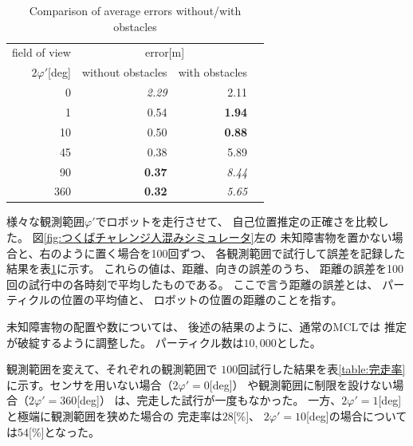 \documentclass{jarticle}
\begin{document}
\begin{table}[htbp]
	\centering
	\caption{Comparison of average errors without/with obstacles}
  \label{table:error}
	\begin{small}
  \begin{tabular}{|r|r|r|r|} \hline
	  field of view & \multicolumn{2}{c|}{error[m]} \\
	  $2\varphi'$[deg]  & without obstacles & with obstacles \\ \hline \hline
	  {0}         & \textit{2.29} & 2.11 \\ \hline
	  {1}         & 0.54 &  \textbf{1.94} \\ \hline
	  {10}        & 0.50 & \textbf{0.88} \\ \hline
	  {45}        & 0.38 & 5.89 \\ \hline
	  {90}        & \textbf{0.37} & \textit{8.44}\\ \hline
	  {360}       & \textbf{0.32} & \textit{5.65} \\ \hline
  \end{tabular}
	\end{small}
\end{table}


様々な観測範囲$\varphi'$でロボットを走行させて、
自己位置推定の正確さを比較した。
図\ref{fig:つくばチャレンジ人混みシミュレータ}左の
未知障害物を置かない場合と、右のように置く場合を100回ずつ、
各観測範囲で試行して誤差を記録した
結果を表\ref{table:error}に示す。
これらの値は、距離、向きの誤差のうち、
距離の誤差を100回の試行中の各時刻で平均したものである。
ここで言う距離の誤差とは、
パーティクルの位置の平均値と、
ロボットの位置の距離のことを指す。


%
%

未知障害物の配置や数については、
後述の結果のように、通常のMCLでは
推定が破綻するように調整した。
パーティクル数は$10,000$とした。


観測範囲を変えて、それぞれの観測範囲で
$100$回試行した結果を表\ref{table:完走率}
に示す。センサを用いない場合（$2\varphi' = 0$[deg]）
や観測範囲に制限を設けない場合（$2\varphi' = 360$[deg]）
は、完走した試行が一度もなかった。
一方、$2\varphi' = 1$[deg]と極端に観測範囲を狭めた場合の
完走率は$28$[\%]、
$2\varphi' = 10$[deg]の場合については$54$[\%]となった。
\end{document}
